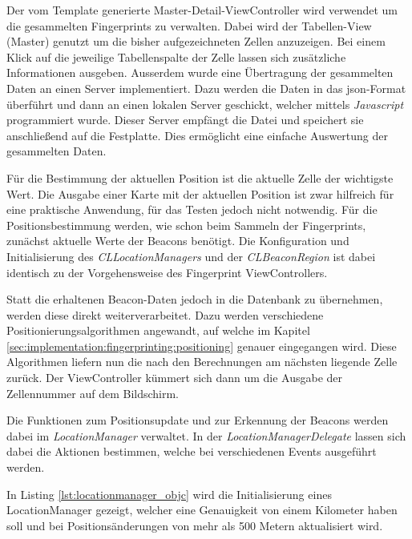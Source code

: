 Der vom Template generierte Master-Detail-ViewController wird verwendet um die gesammelten Fingerprints zu verwalten. Dabei wird der Tabellen-View (Master) genutzt um die bisher aufgezeichneten Zellen anzuzeigen. Bei einem Klick auf die jeweilige Tabellenspalte der Zelle lassen sich zusätzliche Informationen ausgeben.
Ausserdem wurde eine Übertragung der gesammelten Daten an einen Server implementiert. Dazu werden die Daten in das json-Format überführt und dann an einen lokalen Server geschickt, welcher mittels \emph{Javascript} programmiert wurde. Dieser Server empfängt die Datei und speichert sie anschließend auf die Festplatte. 
Dies ermöglicht eine einfache Auswertung der gesammelten Daten. 


Für die Bestimmung der aktuellen Position ist die aktuelle Zelle der wichtigste Wert. Die Ausgabe einer Karte mit der aktuellen Position ist zwar hilfreich für eine praktische Anwendung, für das Testen jedoch nicht notwendig.
Für die Positionsbestimmung werden, wie schon beim Sammeln der Fingerprints, zunächst aktuelle Werte der Beacons benötigt. Die Konfiguration und Initialisierung des \emph{CLLocationManagers} und der \emph{CLBeaconRegion} ist dabei identisch zu der Vorgehensweise des Fingerprint ViewControllers.

Statt die erhaltenen Beacon-Daten jedoch in die Datenbank zu übernehmen, werden diese direkt weiterverarbeitet. Dazu werden verschiedene Positionierungsalgorithmen angewandt, auf welche im Kapitel \ref{sec:implementation:fingerprinting:positioning} genauer eingegangen wird. 
Diese Algorithmen liefern nun die nach den Berechnungen am nächsten liegende Zelle zurück. Der ViewController kümmert sich dann um die Ausgabe der Zellennummer auf dem Bildschirm.



Die Funktionen zum Positionsupdate und zur Erkennung der Beacons werden dabei im \emph{LocationManager} verwaltet.
In der \emph{LocationManagerDelegate} lassen sich dabei die Aktionen bestimmen, welche bei verschiedenen Events ausgeführt werden.

In Listing \ref{lst:locationmanager_objc} wird die Initialisierung eines LocationManager gezeigt, welcher eine Genauigkeit von einem Kilometer haben soll und bei Positionsänderungen von mehr als 500 Metern aktualisiert wird.

